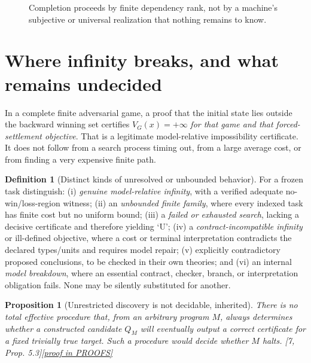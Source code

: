 \documentclass[11pt,letterpaper]{article}
\newtheorem{proposition}[theorem]{Proposition}
\theoremstyle{definition}
\newtheorem{definition}[theorem]{Definition}
\theoremstyle{remark}
\newcommand{\prooflink}[1]{\hfill\hyperlink{proof:#1}{\footnotesize[proof in PROOFS]}}
\newcommand{\src}[1]{\textup{[#1]}}
\begin{document}
\begin{figure}[htbp]\centering
{}
\caption{Completion proceeds by finite dependency rank, not by a machine's subjective or universal realization that nothing remains to know.}\end{figure}

\section{Where infinity breaks, and what remains undecided}
In a complete finite adversarial game, a proof that the initial state lies outside the backward winning set certifies $V_G(x)=+\infty$ \emph{for that game and that forced-settlement objective}. That is a legitimate model-relative impossibility certificate. It does not follow from a search process timing out, from a large average cost, or from finding a very expensive finite path.

\begin{definition}[Distinct kinds of unresolved or unbounded behavior]\label{def:infinity}
For a frozen task distinguish: (i) \emph{genuine model-relative infinity}, with a verified adequate no-win/loss-region witness; (ii) an \emph{unbounded finite family}, where every indexed task has finite cost but no uniform bound; (iii) a \emph{failed or exhausted search}, lacking a decisive certificate and therefore yielding `U'; (iv) a \emph{contract-incompatible infinity} or ill-defined objective, where a cost or terminal interpretation contradicts the declared types/units and requires model repair; (v) explicitly contradictory proposed conclusions, to be checked in their own theories; and (vi) an internal \emph{model breakdown}, where an essential contract, checker, branch, or interpretation obligation fails. None may be silently substituted for another.
\end{definition}

\begin{proposition}[Unrestricted discovery is not decidable, inherited]\label{prop:undecidable}\hypertarget{claim:undecidable}{}
There is no total effective procedure that, from an arbitrary program $M$, always determines whether a constructed candidate $Q_M$ will eventually output a correct certificate for a fixed trivially true target. Such a procedure would decide whether $M$ halts. \src{7, Prop. 5.3}\prooflink{undecidable}
\end{proposition}
\end{document}
